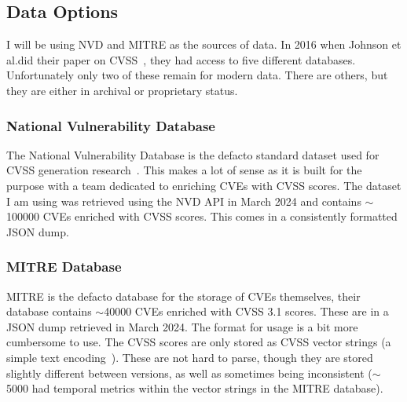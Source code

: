 \documentclass[12pt]{article}
\begin{document}
\subsection{Data Options}

I will be using NVD and MITRE as the sources of data. In 2016 when Johnson et al.\@ did their paper
on CVSS~\cite{bayes}, they had access to five different databases. Unfortunately only two of these
remain for modern data. There are others, but they are either in archival or proprietary status.

\subsubsection{National Vulnerability Database} \label{NVD_SECTION}

The National Vulnerability Database is the defacto standard dataset used for CVSS generation
research~\cite{costa, nvd_example1, nvd_example2}.  This makes a lot of sense as it is built
for the purpose with a team dedicated to enriching CVEs with CVSS scores. The dataset I am using was
retrieved using the NVD API in March 2024 and contains $\sim$100000 CVEs enriched with CVSS scores. This
comes in a consistently formatted JSON dump.

\subsubsection{MITRE Database}  \label{MITRE_SECTION}

MITRE is the defacto database for the storage of CVEs themselves, their database contains $\sim$40000
CVEs enriched with CVSS 3.1 scores. These are in a JSON dump retrieved in March 2024. The
format for usage is a bit more cumbersome to use. The CVSS scores are only stored as CVSS vector
strings (a simple text encoding~\cite{vector_string}). These are not hard to parse, though they are stored slightly
different between versions, as well as sometimes being inconsistent ($\sim$5000 had temporal metrics within
the vector strings in the MITRE database).
\end{document}
